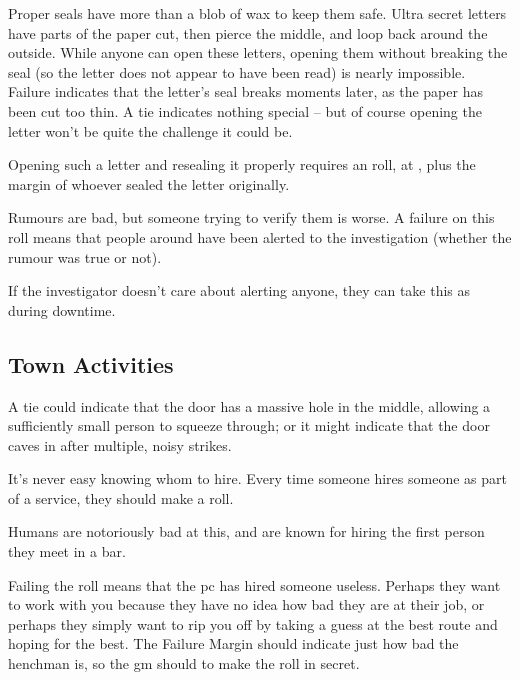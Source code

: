 \begin{multicols}{2}
Proper seals have more than a blob of wax to keep them safe.
Ultra secret letters have parts of the paper cut, then pierce the middle, and loop back around the outside.
While anyone can open these letters, opening them without breaking the seal (so the letter does not appear to have been read) is nearly impossible.
Failure indicates that the letter's seal breaks moments later, as the paper has been cut too thin.
A tie indicates nothing special -- but of course opening the letter won't be quite the challenge it could be.

Opening such a letter and resealing it properly requires an  roll, at \tn[14], plus the margin of whoever sealed the letter originally.

Rumours are bad, but someone trying to verify them is worse.
A failure on this roll means that people around have been alerted to the investigation (whether the rumour was true or not).

If the investigator doesn't care about alerting anyone, they can take this as  during \gls{downtime}.

\subsection{Town Activities}

A tie could indicate that the door has a massive hole in the middle, allowing a sufficiently small person to squeeze through; or it might indicate that the door caves in after multiple, noisy strikes.

It's never easy knowing whom to hire.
Every time someone hires someone as part of a service, they should make a roll.

Humans are notoriously bad at this, and are known for hiring the first person they meet in a bar.

Failing the roll means that the \gls{pc} has hired someone useless.
Perhaps they want to work with you because they have no idea how bad they are at their job, or perhaps they simply want to rip you off by taking a guess at the best route and hoping for the best.
The Failure Margin should indicate just how bad the henchman is, so the \gls{gm} should to make the roll in secret.


\end{multicols}

